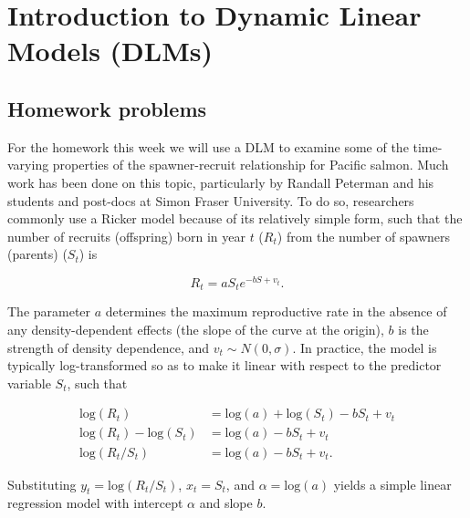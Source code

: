 

\usepackage{Sweave}






\chapter{Introduction to Dynamic Linear Models (DLMs)}



\section{Homework problems}

For the homework this week we will use a DLM to examine some of the time-varying properties of the spawner-recruit relationship for Pacific salmon.  Much work has been done on this topic, particularly by Randall Peterman and his students and post-docs at Simon Fraser University.  To do so, researchers commonly use a Ricker model because of its relatively simple form, such that the number of recruits (offspring) born in year $t$ ($R_t$) from the number of spawners (parents) ($S_t$) is

\begin{equation}\label{eqn:baseRicker}
R_t = a S_t e^{-b S + v_t}.
\end{equation}


\noindent The parameter $a$ determines the maximum reproductive rate in the absence of any density-dependent effects (the slope of the curve at the origin), $b$ is the strength of density dependence, and $v_t \sim N(0,\sigma)$.  In practice, the model is typically log-transformed so as to make it linear with respect to the predictor variable $S_t$, such that

\begin{equation}\label{eqn:lnRicker}
\begin{aligned}
\text{log}(R_t) &= \text{log}(a) + \text{log}(S_t) -b S_t + v_t \\
\text{log}(R_t) - \text{log}(S_t) &= \text{log}(a) -b S_t + v_t \\
\text{log}(R_t/S_t) &= \text{log}(a) - b S_t + v_t.
\end{aligned}
\end{equation}


\noindent Substituting $y_t = \text{log}(R_t/S_t)$, $x_t = S_t$, and $\alpha = \text{log}(a)$ yields a simple linear regression model with intercept $\alpha$ and slope $b$.

